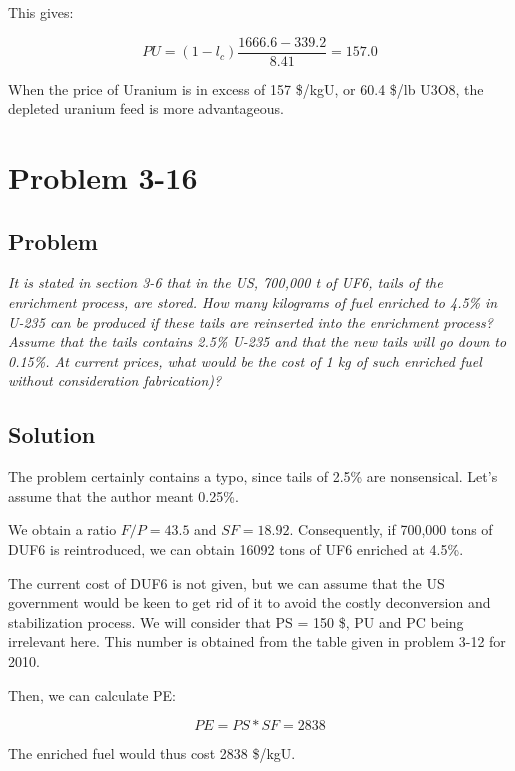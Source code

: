 This gives:

\begin{equation}
PU = (1-l_c)\frac{1666.6-339.2}{8.41} = 157.0
\end{equation}

When the price of Uranium is in excess of 157 \$/kgU, or 60.4 \$/lb U3O8, the depleted uranium feed is more advantageous.

\section{Problem 3-16}
\label{prob316}

\subsection{Problem}
\textit{It is stated in section 3-6 that in the US, 700,000 t of UF6, tails of the enrichment process, are stored. How many kilograms of fuel enriched to 4.5\% in U-235 can be produced if these tails are reinserted into the enrichment process? Assume that the tails contains 2.5\% U-235 and that the new tails will go down to 0.15\%. At current prices, what would be the cost of 1 kg of such enriched fuel without consideration fabrication)?}

\subsection{Solution}

The problem certainly contains a typo, since tails of 2.5\% are nonsensical. Let's assume that the author meant 0.25\%.

We obtain a ratio $F/P = 43.5$ and $SF = 18.92$. Consequently, if 700,000 tons of DUF6 is reintroduced, we can obtain 16092 tons of UF6 enriched at 4.5\%.

The current cost of DUF6 is not given, but we can assume that the US government would be keen to get rid of it to avoid the costly deconversion and stabilization process. We will consider that PS = 150 \$, PU and PC being irrelevant here. This number is obtained from the table given in problem 3-12 for 2010.

Then, we can calculate PE:

\begin{equation}
PE = PS*SF = 2838
\end{equation}

The enriched fuel would thus cost 2838 \$/kgU.

